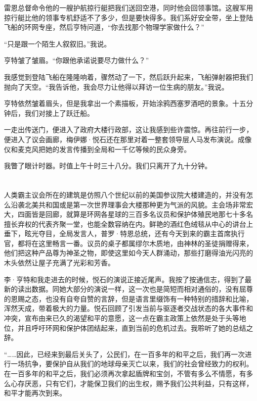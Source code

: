 \documentclass[AutoFakeBold=true]{book}
\begin{document}
雷恩总督命令他的一艘护航掠行艇把我们送回空港，同时他会回领事馆。这艘军用掠行艇比他的领事专机舒适不了多少，但是要快得多。我们系好安全带，坐上登陆飞船的环网专座，然后亨特问道，``你去找那个物理学家做什么？''

``只是跟一个陌生人叙叙旧。''我说。

亨特皱了皱眉。``你跟他承诺说要尽力做什么？''

我感觉到登陆飞船在隆隆响着，骤然动了一下，然后跃升起来，飞船弹射器把我们抛向了天空。``我告诉他，我会尽力让他得以拜访一位生病的朋友。''我说。

亨特依然皱着眉头，但是我拿出一个素描板，开始涂鸦西塞罗酒吧的景象。十五分钟后，我们对接上了跃迁船。

一走出传送门，便进入了政府大楼行政部，这让我感到些许震惊。再往前行一步，便进入了议会画廊，梅伊娜·悦石还在那里对着一整套领导层人马发布演说。成像仪和麦克风把她的发言传播到全局和一千亿等候的民众身旁。

我瞥了眼计时器。时值上午十时三十八分。我们只离开了九十分钟。

\chapter{}

人类霸主议会所在的建筑是仿照八个世纪以前的美国参议院大楼建造的，并没有怎么沿袭北美共和国或是第一次世界理事会大楼那种更为气派的风貌。主会场非常宏大，四面皆是回廊，就算是环网各星球的三百多名议员和保护体殖民地那七十多名擅长弃权的代表齐聚一堂，也能全数容纳在内。鲜艳的酒红色绒毯从中心的讲台上垂下，眩光夺目，全局发言人，普罗·特恩总统，还有今天到来的霸主首席执行官，都将在这里畅言一番。议员的桌子都属缪尔木质地，由神林的圣徒捐赠得来，他们把这种产品尊为神圣之物，即使这里如今天人群涌动，那些打磨得油光闪亮的木头依然让屋子充满了光彩和芳香。

李·亨特和我走进去的时候，悦石的演说正接近尾声。我按了按通信志，得到了最新的读出数据。同她大部分的演说一样，这一次也是简短而相对通俗的，没有屈尊的恩赐之态，也没有自夸自赞的言辞，但是语言里缀饰有一种特别的措辞和比喻，浑然天成，带着极大的力量。悦石回顾了引发当前与驱逐者交战状态的各大事件和冲突，宣布由来已久的渴望和平的意愿，这一点在霸主政策上依然是处于头等地位，并且呼吁环网和保护体团结起来，直到当前的危机过去。我聆听了她的总结之辞。

``……因此，已经来到最后关头了，公民们，在一百多年的和平之后，我们再一次进行一场抗争，要保护自从我们的地球母亲灭亡以来，我们的社会曾经致力的权利。在一百多年的和平之后，我们必须再次拿起盾牌和宝剑，不管有多么不情愿，有多么心存厌恶，只有它们，才能保卫我们的出生权，赐予我们公共利益，只有这样，和平才能再次到来。
\end{document}
